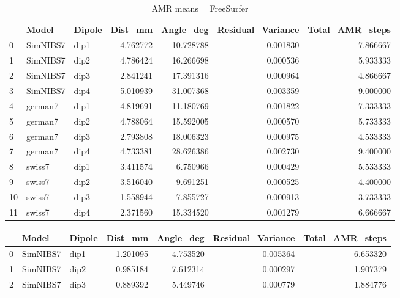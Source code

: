 \begin{table}
\begin{tabular}{lllrrrr}
\toprule
{} &     Model & Dipole &   Dist\_mm &  Angle\_deg &  Residual\_Variance &  Total\_AMR\_steps \\
\midrule
0  &  SimNIBS7 &   dip1 &  4.762772 &  10.728788 &           0.001830 &         7.866667 \\
1  &  SimNIBS7 &   dip2 &  4.786424 &  16.266698 &           0.000536 &         5.933333 \\
2  &  SimNIBS7 &   dip3 &  2.841241 &  17.391316 &           0.000964 &         4.866667 \\
3  &  SimNIBS7 &   dip4 &  5.010939 &  31.007368 &           0.003359 &         9.000000 \\
4  &   german7 &   dip1 &  4.819691 &  11.180769 &           0.001822 &         7.333333 \\
5  &   german7 &   dip2 &  4.788064 &  15.592005 &           0.000570 &         5.733333 \\
6  &   german7 &   dip3 &  2.793808 &  18.006323 &           0.000975 &         4.533333 \\
7  &   german7 &   dip4 &  4.733381 &  28.626386 &           0.002730 &         9.400000 \\
8  &    swiss7 &   dip1 &  3.411574 &   6.750966 &           0.000429 &         5.533333 \\
9  &    swiss7 &   dip2 &  3.516040 &   9.691251 &           0.000525 &         4.400000 \\
10 &    swiss7 &   dip3 &  1.558944 &   7.855727 &           0.000913 &         3.733333 \\
11 &    swiss7 &   dip4 &  2.371560 &  15.334520 &           0.001279 &         6.666667 \\
\bottomrule
\end{tabular}
\caption{AMR means \ \textemdash \ FreeSurfer}
\end{table}\begin{table}
\begin{tabular}{lllrrrr}
\toprule
{} &     Model & Dipole &   Dist\_mm &  Angle\_deg &  Residual\_Variance &  Total\_AMR\_steps \\
\midrule
0  &  SimNIBS7 &   dip1 &  1.201095 &   4.753520 &           0.005364 &         6.653320 \\
1  &  SimNIBS7 &   dip2 &  0.985184 &   7.612314 &           0.000297 &         1.907379 \\
2  &  SimNIBS7 &   dip3 &  0.889392 &   5.449746 &           0.000779 &         1.884776 \\

\end{tabular}
\end{table}
